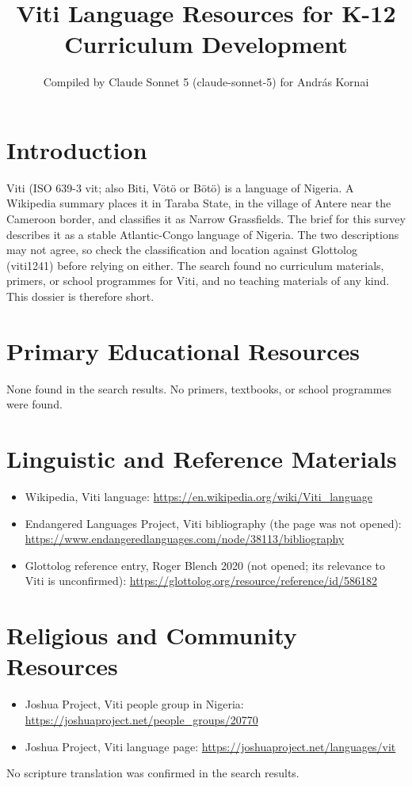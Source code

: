 \documentclass[12pt]{article}
\title{Viti Language Resources for K-12 Curriculum Development}
\author{Compiled by Claude Sonnet 5 (claude-sonnet-5) for Andr\'as Kornai}
\date{}
\begin{document}
\maketitle

\section{Introduction}
Viti (ISO 639-3 vit; also Biti, V\"ot\"o or B\"ot\"o) is a language of Nigeria. A Wikipedia summary places it in Taraba State, in the village of Antere near the Cameroon border, and classifies it as Narrow Grassfields. The brief for this survey describes it as a stable Atlantic-Congo language of Nigeria. The two descriptions may not agree, so check the classification and location against Glottolog (viti1241) before relying on either. The search found no curriculum materials, primers, or school programmes for Viti, and no teaching materials of any kind. This dossier is therefore short.

\section{Primary Educational Resources}
None found in the search results. No primers, textbooks, or school programmes were found.

\section{Linguistic and Reference Materials}
\begin{itemize}
\item Wikipedia, Viti language: \url{https://en.wikipedia.org/wiki/Viti_language}
\item Endangered Languages Project, Viti bibliography (the page was not opened): \url{https://www.endangeredlanguages.com/node/38113/bibliography}
\item Glottolog reference entry, Roger Blench 2020 (not opened; its relevance to Viti is unconfirmed): \url{https://glottolog.org/resource/reference/id/586182}
\end{itemize}

\section{Religious and Community Resources}
\begin{itemize}
\item Joshua Project, Viti people group in Nigeria: \url{https://joshuaproject.net/people_groups/20770}
\item Joshua Project, Viti language page: \url{https://joshuaproject.net/languages/vit}
\end{itemize}
No scripture translation was confirmed in the search results.
\end{document}
